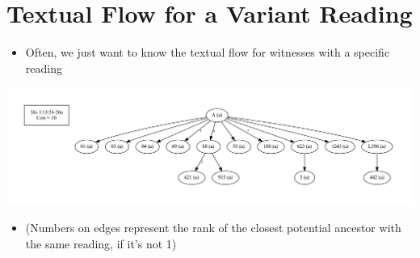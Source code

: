 \documentclass[10pt]{beamer}
\begin{document}
	\section*{Textual Flow for a Variant Reading}
	\begin{frame}
		\begin{itemize}
			\item Often, we just want to know the textual flow for witnesses with a specific reading
		\end{itemize}
		\begin{center}
			\includegraphics[width=\textwidth]{../img/B25K1V13U24-26Ra-coherence-attestations.pdf}
		\end{center}
		\begin{itemize}
			\item (Numbers on edges represent the rank of the closest potential ancestor with the same reading, if it's not 1)
		\end{itemize}
	\end{frame}
\end{document}
